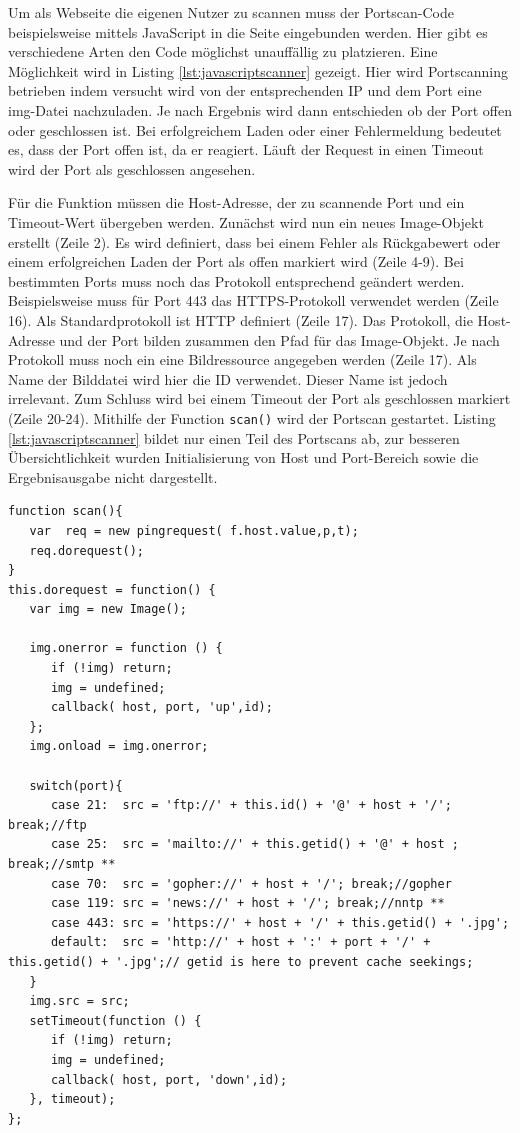 Um als Webseite die eigenen Nutzer zu scannen muss der Portscan-Code beispielsweise mittels
JavaScript in die Seite eingebunden werden. Hier gibt es verschiedene Arten den Code möglichst
unauffällig zu platzieren. Eine Möglichkeit wird in Listing \ref{lst:javascriptscanner} gezeigt.
Hier wird Portscanning betrieben indem versucht wird von der entsprechenden IP und dem Port eine
img-Datei nachzuladen. Je nach Ergebnis wird dann entschieden ob der Port offen oder geschlossen
ist. Bei erfolgreichem Laden oder einer Fehlermeldung bedeutet es, dass der Port offen ist, da er
reagiert. Läuft der Request in einen Timeout wird der Port als geschlossen angesehen.

Für die Funktion müssen die Host-Adresse, der zu scannende Port und ein Timeout-Wert übergeben
werden.
Zunächst wird nun ein neues Image-Objekt erstellt (Zeile 2). Es wird definiert, dass bei einem
Fehler als Rückgabewert oder einem erfolgreichen Laden der Port als offen markiert wird (Zeile 4-9).
Bei bestimmten Ports muss noch das Protokoll entsprechend geändert werden. Beispielsweise muss für
Port 443 das HTTPS-Protokoll verwendet werden (Zeile 16). Als Standardprotokoll ist HTTP
definiert (Zeile 17). Das Protokoll, die Host-Adresse und der Port bilden zusammen den Pfad für das
Image-Objekt. Je nach Protokoll muss noch ein eine Bildressource angegeben werden (Zeile 17). Als
Name der Bilddatei wird hier die ID verwendet. Dieser Name ist jedoch irrelevant. Zum Schluss wird
bei einem Timeout der Port als geschlossen markiert (Zeile 20-24). Mithilfe der Function
\lstinline[style=eclipse]{scan()} wird der Portscan gestartet. Listing \ref{lst:javascriptscanner}
bildet nur einen Teil des Portscans ab, zur besseren Übersichtlichkeit wurden Initialisierung von Host und
Port-Bereich sowie die Ergebnisausgabe nicht dargestellt.

\newpage
\begin{scriptsize}
\begin{lstlisting}
function scan(){
   var  req = new pingrequest( f.host.value,p,t);
   req.dorequest();
}
this.dorequest = function() {
   var img = new Image();

   img.onerror = function () {
      if (!img) return;
      img = undefined;
      callback( host, port, 'up',id);
   };
   img.onload = img.onerror;

   switch(port){
      case 21:  src = 'ftp://' + this.id() + '@' + host + '/'; break;//ftp
      case 25:  src = 'mailto://' + this.getid() + '@' + host ; break;//smtp **
      case 70:  src = 'gopher://' + host + '/'; break;//gopher
      case 119: src = 'news://' + host + '/'; break;//nntp **
      case 443: src = 'https://' + host + '/' + this.getid() + '.jpg';
      default:  src = 'http://' + host + ':' + port + '/' + this.getid() + '.jpg';// getid is here to prevent cache seekings;
   }
   img.src = src;
   setTimeout(function () {
      if (!img) return;
      img = undefined;
      callback( host, port, 'down',id);
   }, timeout);
};
\end{lstlisting}
\end{scriptsize}

